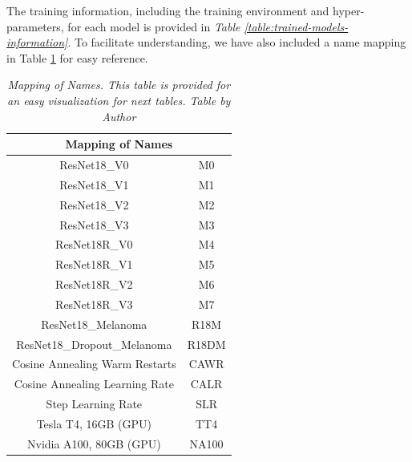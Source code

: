 The training information, including the training environment and
hyper-parameters, for each model is provided in \textit{Table
\ref{table:trained-models-information}}. To facilitate understanding, we have
also included a name mapping in Table \ref{table:mapping-names} for easy
reference.

\begin{table}[H]
  \centering
  \begin{tabular}{cc}
    \toprule

    \multicolumn{2}{c}{\textbf{Mapping of Names}} \\
    \midrule
    ResNet18\_V0 & M0 \\
    ResNet18\_V1 & M1 \\
    ResNet18\_V2 & M2 \\
    ResNet18\_V3 & M3 \\
    ResNet18R\_V0  & M4 \\
    ResNet18R\_V1  & M5 \\
    ResNet18R\_V2 & M6 \\
    ResNet18R\_V3  & M7 \\
    ResNet18\_Melanoma & R18M \\
    ResNet18\_Dropout\_Melanoma & R18DM \\
    Cosine Annealing Warm Restarts & CAWR \\
    Cosine Annealing Learning Rate & CALR \\
    Step Learning Rate & SLR \\
    Tesla T4, 16GB (GPU) & TT4 \\
    Nvidia A100, 80GB (GPU) & NA100 \\ \bottomrule
  \end{tabular}
  \caption[Mapping of Names.]
  {\textit{Mapping of Names. This table is provided for an easy visualization for next tables.
  Table by Author}}
  {\label{table:mapping-names}}
\end{table}

\newpage

